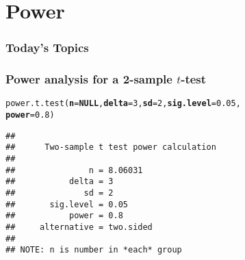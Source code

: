 \documentclass[color=usenames,dvipsnames]{beamer}\usepackage[]{graphicx}\usepackage[]{color}
\makeatletter
\newcommand{\hlnum}[1]{\textcolor[rgb]{0.69,0.494,0}{#1}}%
\newcommand{\hlstd}[1]{\textcolor[rgb]{0,0,0}{#1}}%
\newcommand{\hlkwa}[1]{\textcolor[rgb]{0,0,0}{\textbf{#1}}}%
\newcommand{\hlkwc}[1]{\textcolor[rgb]{0,0,0}{\textbf{#1}}}%
\newcommand{\hlkwd}[1]{\textcolor[rgb]{0.004,0.004,0.506}{#1}}%
\newenvironment{kframe}{%
 \def\at@end@of@kframe{}%
 \ifinner\ifhmode%
  \def\at@end@of@kframe{\end{minipage}}%
  \begin{minipage}{\columnwidth}%
 \fi\fi%
 \def\FrameCommand##1{\hskip\@totalleftmargin \hskip-\fboxsep
 \colorbox{shadecolor}{##1}\hskip-\fboxsep
     \hskip-\linewidth \hskip-\@totalleftmargin \hskip\columnwidth}%
 \MakeFramed {\advance\hsize-\width
   \@totalleftmargin\z@ \linewidth\hsize
   \@setminipage}}%
 {\par\unskip\endMakeFramed%
 \at@end@of@kframe}
\newenvironment{knitrout}{}{} %
\makeatother
\begin{document}
\section{Power}


\begin{frame}[plain]
  \frametitle{Today's Topics}
  \Large
  \tableofcontents[currentsection]
\end{frame}





\begin{frame}[fragile]
\frametitle{Power analysis for a 2-sample $t$-test}
\begin{knitrout}
\color{fgcolor}\begin{kframe}
\begin{alltt}
\hlkwd{power.t.test}\hlstd{(}\hlkwc{n}\hlstd{=}\hlkwa{NULL}\hlstd{,} \hlkwc{delta}\hlstd{=}\hlnum{3}\hlstd{,} \hlkwc{sd}\hlstd{=}\hlnum{2}\hlstd{,} \hlkwc{sig.level}\hlstd{=}\hlnum{0.05}\hlstd{,}
             \hlkwc{power}\hlstd{=}\hlnum{0.8}\hlstd{)}
\end{alltt}
\begin{verbatim}
## 
##      Two-sample t test power calculation 
## 
##               n = 8.06031
##           delta = 3
##              sd = 2
##       sig.level = 0.05
##           power = 0.8
##     alternative = two.sided
## 
## NOTE: n is number in *each* group
\end{verbatim}
\end{kframe}
\end{knitrout}
\end{frame}
\end{document}
